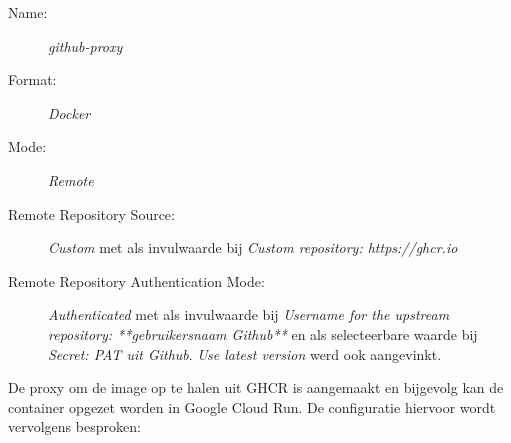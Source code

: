 \begin{description}
    \item[Name:]
    \textit{github-proxy}
    \item[Format:] 
    \textit{Docker}
    \item[Mode:] 
    \textit{Remote}
    \item[Remote Repository Source:] 
    \textit{Custom} met als invulwaarde bij \textit{Custom repository: https://ghcr.io}
    \item[Remote Repository Authentication Mode:] 
    \textit{Authenticated} met als invulwaarde bij \textit{Username for the upstream repository: **gebruikersnaam Github**} en als selecteerbare waarde bij \textit{Secret: PAT uit Github}. \textit{Use latest version} werd ook aangevinkt.
\end{description}

De proxy om de image op te halen uit GHCR is aangemaakt en bijgevolg kan de container opgezet worden in Google Cloud Run. De configuratie hiervoor wordt vervolgens besproken:

